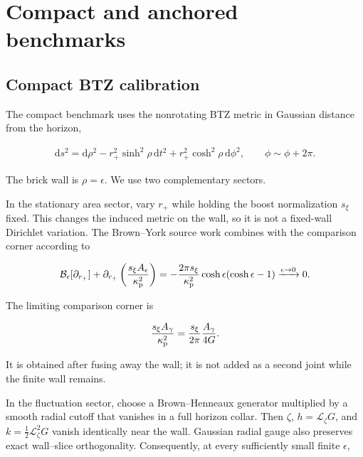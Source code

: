 \section{Compact and anchored benchmarks}\label{sec:benchmarks}

\subsection{Compact BTZ calibration}\label{subsec:btz-benchmark}

The compact benchmark uses the nonrotating BTZ metric in Gaussian distance from the horizon,

\begin{align}
\mathrm ds^2
=\mathrm d\rho^2-r_+^2\sinh^2\rho\,\mathrm dt^2
+r_+^2\cosh^2\rho\,\mathrm d\phi^2,
\qquad \phi\sim\phi+2\pi . \label{eq:btz-gaussian}
\end{align}

The brick wall is $\rho=\epsilon$. We use two complementary sectors.

In the stationary area sector, vary $r_+$ while holding the boost normalization $s_\xi$ fixed. This changes the induced metric on the wall, so it is not a fixed-wall Dirichlet variation. The Brown--York source work combines with the comparison corner according to

\begin{align}
\mathcal B_\epsilon[\partial_{r_+}]
+\partial_{r_+}\left(
\frac{s_\xi A_\epsilon}{\kappa_{\rm p}^{2}}
\right)
=-\frac{2\pi s_\xi}{\kappa_{\rm p}^{2}}
\cosh\epsilon(\cosh\epsilon-1)
\xrightarrow{\epsilon\to0}0. \label{eq:btz-transgression}
\end{align}

The limiting comparison corner is

\begin{align}
\frac{s_\xi A_\gamma}{\kappa_{\rm p}^{2}}
=\frac{s_\xi}{2\pi}\frac{A_\gamma}{4G}.
\end{align}

It is obtained after fusing away the wall; it is not added as a second joint while the finite wall remains.

In the fluctuation sector, choose a Brown--Henneaux generator multiplied by a smooth radial cutoff that vanishes in a full horizon collar. Then $\zeta$, $h=\mathcal L_\zeta G$, and $k=\tfrac12\mathcal L_\zeta^2G$ vanish identically near the wall. Gaussian radial gauge also preserves exact wall--slice orthogonality. Consequently, at every sufficiently small finite $\epsilon$,

